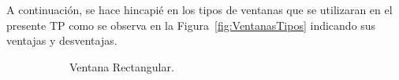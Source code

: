      A continuación, se hace hincapié en los tipos de ventanas que se utilizaran en el 
     presente TP como se observa en la Figura~\ref{fig:VentanasTipos} indicando sus 
     ventajas y desventajas.
        \begin{figure}[H]
            \centering
            \begin{subfigure}[H]{0.45\textwidth}
            \caption{Ventana Rectangular.}
            \label{fig:VentanaRec}
            \end{subfigure}
            \hfill 
            \begin{subfigure}[H]{0.45\textwidth}

\end{subfigure}
\end{figure}
